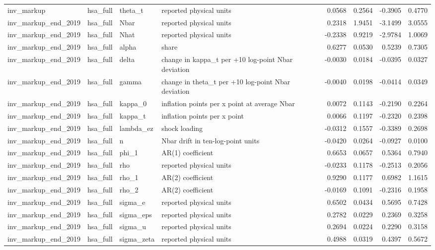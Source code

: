\begin{tabular}{llllrrrr}
inv\_markup & hsa\_full & theta\_t & reported physical units & 0.0568 & 0.2564 & -0.3905 & 0.4770 \\
inv\_markup\_end\_2019 & hsa\_full & Nbar & reported physical units & 0.2318 & 1.9451 & -3.1499 & 3.0555 \\
inv\_markup\_end\_2019 & hsa\_full & Nhat & reported physical units & -0.2338 & 0.9219 & -2.9784 & 1.0069 \\
inv\_markup\_end\_2019 & hsa\_full & alpha & share & 0.6277 & 0.0530 & 0.5239 & 0.7305 \\
inv\_markup\_end\_2019 & hsa\_full & delta & change in kappa\_t per +10 log-point Nbar deviation & -0.0030 & 0.0184 & -0.0395 & 0.0327 \\
inv\_markup\_end\_2019 & hsa\_full & gamma & change in theta\_t per +10 log-point Nbar deviation & -0.0040 & 0.0198 & -0.0414 & 0.0349 \\
inv\_markup\_end\_2019 & hsa\_full & kappa\_0 & inflation points per x point at average Nbar & 0.0072 & 0.1143 & -0.2190 & 0.2264 \\
inv\_markup\_end\_2019 & hsa\_full & kappa\_t & inflation points per x point & 0.0066 & 0.1197 & -0.2320 & 0.2398 \\
inv\_markup\_end\_2019 & hsa\_full & lambda\_ez & shock loading & -0.0312 & 0.1557 & -0.3389 & 0.2698 \\
inv\_markup\_end\_2019 & hsa\_full & n & Nbar drift in ten-log-point units & -0.0420 & 0.0264 & -0.0927 & 0.0100 \\
inv\_markup\_end\_2019 & hsa\_full & phi\_1 & AR(1) coefficient & 0.6653 & 0.0657 & 0.5364 & 0.7940 \\
inv\_markup\_end\_2019 & hsa\_full & rho & reported physical units & -0.0233 & 0.1178 & -0.2513 & 0.2056 \\
inv\_markup\_end\_2019 & hsa\_full & rho\_1 & AR(2) coefficient & 0.9290 & 0.1177 & 0.6982 & 1.1615 \\
inv\_markup\_end\_2019 & hsa\_full & rho\_2 & AR(2) coefficient & -0.0169 & 0.1091 & -0.2316 & 0.1958 \\
inv\_markup\_end\_2019 & hsa\_full & sigma\_e & reported physical units & 0.6502 & 0.0434 & 0.5695 & 0.7428 \\
inv\_markup\_end\_2019 & hsa\_full & sigma\_eps & reported physical units & 0.2782 & 0.0229 & 0.2369 & 0.3258 \\
inv\_markup\_end\_2019 & hsa\_full & sigma\_u & reported physical units & 0.2694 & 0.0224 & 0.2290 & 0.3158 \\
inv\_markup\_end\_2019 & hsa\_full & sigma\_zeta & reported physical units & 0.4988 & 0.0319 & 0.4397 & 0.5672 \\

\end{tabular}

